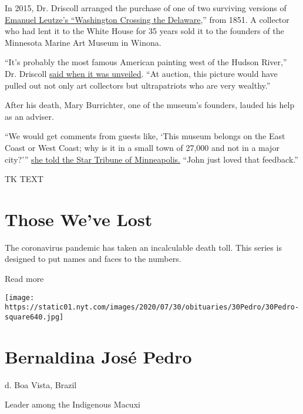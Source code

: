 In 2015, Dr. Driscoll arranged the purchase of one of two surviving
versions of \href{https://www.mmam.org/collections}{Emanuel Leutze's
``Washington Crossing the Delaware},'' from 1851. A collector who had
lent it to the White House for 35 years sold it to the founders of the
Minnesota Marine Art Museum in Winona.

``It's probably the most famous American painting west of the Hudson
River,'' Dr. Driscoll
\href{https://www.startribune.com/washington-crossing-the-delaware-lands-in-winona-museum/297329091/}{said
when it was unveiled}. ``At auction, this picture would have pulled out
not only art collectors but ultrapatriots who are very wealthy.''

After his death, Mary Burrichter, one of the museum's founders, lauded
his help as an adviser.

``We would get comments from guests like, `This museum belongs on the
East Coast or West Coast; why is it in a small town of 27,000 and not in
a major city?'''
\href{https://www.startribune.com/minnesota-born-art-scholar-john-driscoll-dies-of-covid-19-complications/569964762/}{she
told the Star Tribune of Minneapolis.} ``John just loved that
feedback.''

TK TEXT

\href{https://www.nytimes.com/interactive/2020/obituaries/people-died-coronavirus-obituaries.html?action=click\&pgtype=Article\&state=default\&region=BELOW_MAIN_CONTENT\&context=covid_obits_promo}{}

\hypertarget{those-weve-lost}{%
\section{Those We've Lost}\label{those-weve-lost}}

The coronavirus pandemic has taken an incalculable death toll. This
series is designed to put names and faces to the numbers.

Read more

\texttt{[image: https://static01.nyt.com/images/2020/07/30/obituaries/30Pedro/30Pedro-square640.jpg]}

\hypertarget{bernaldina-josuxe9-pedro}{%
\section{Bernaldina José Pedro}\label{bernaldina-josuxe9-pedro}}

d. Boa Vista, Brazil

Leader among the Indigenous Macuxi

